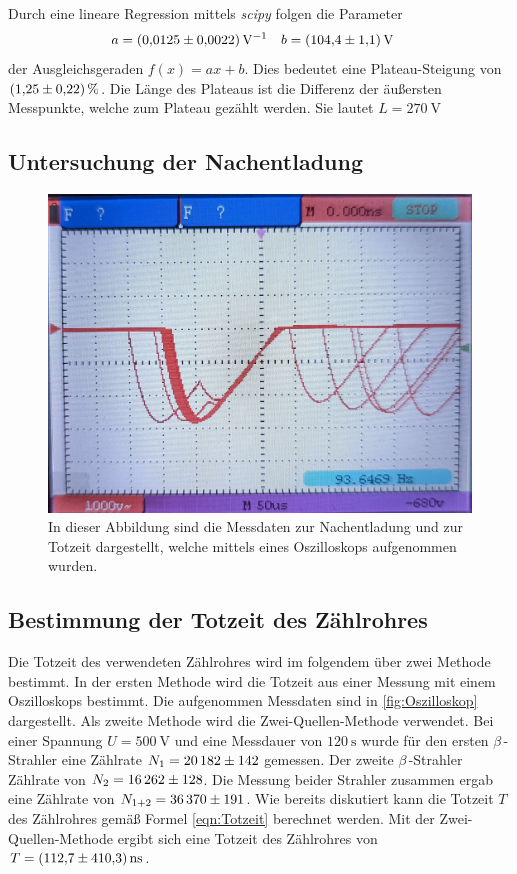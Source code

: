 Durch eine lineare Regression mittels \textit{scipy} \cite{scipy} folgen die Parameter
\begin{align*}
  a &= \qty{0.0125+-0.0022}{\volt^{-1}} & b &= \qty{104.4+-1.1}{\volt}
\end{align*}
der Ausgleichsgeraden $f(x) = ax + b$. Dies bedeutet eine Plateau-Steigung von $\qty{1.25+-0.22}{\percent}$. Die Länge des Plateaus ist die Differenz der äußersten Messpunkte,
welche zum Plateau gezählt werden. Sie lautet $L = \qty{270}{\volt}$

\subsection{Untersuchung der Nachentladung}
\label{subsec:Nachentladung}

\begin{figure}
  \centering
  \includegraphics[width = .8\textwidth]{content/Oszilloskop_bild.jpg}
  \caption{In dieser Abbildung sind die Messdaten zur Nachentladung und zur Totzeit dargestellt, welche mittels eines Oszilloskops aufgenommen wurden.}
  \label{fig:Oszilloskop}
\end{figure}

\subsection{Bestimmung der Totzeit des Zählrohres}
\label{subsec:A_Totzeit}
Die Totzeit des verwendeten Zählrohres wird im folgendem über zwei Methode bestimmt. 
In der ersten Methode wird die Totzeit aus einer Messung mit einem Oszilloskops bestimmt. Die aufgenommen Messdaten sind in \autoref{fig:Oszilloskop} dargestellt.
Als zweite Methode wird die Zwei-Quellen-Methode verwendet. Bei einer Spannung $U = \qty{500}{\volt}$ und eine Messdauer von $\qty{120}{\second}$ wurde für den ersten 
$\beta$\,-Strahler eine Zählrate $N_1 = \num{20182 +- 142}$ gemessen. Der zweite $\beta$\,-Strahler Zählrate von $N_2 = \num{16262 +- 128}$. Die Messung beider 
Strahler zusammen ergab eine Zählrate von $N_{1+2} = \num{36370 +- 191}$. Wie bereits diskutiert kann die Totzeit $T$ des Zählrohres gemäß Formel \ref{eqn:Totzeit}
berechnet werden. Mit der Zwei-Quellen-Methode ergibt sich eine Totzeit des Zählrohres von $T = \qty{112.7+-410.3}{\nano\second}$.

